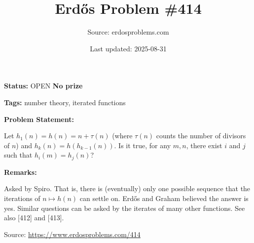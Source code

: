 \documentclass{article}
\title{Erd\H{o}s Problem \#414}
\date{Last updated: 2025-08-31}
\author{Source: erdosproblems.com}
\begin{document}
\maketitle

\noindent\textbf{Status:} OPEN \quad \textbf{No prize}

\noindent\textbf{Tags:} number theory, iterated functions

\medskip
\noindent\textbf{Problem Statement:}

Let $h_1(n)=h(n)=n+\tau(n)$ (where $\tau(n)$ counts the number of divisors of $n$) and $h_k(n)=h(h_{k-1}(n))$. Is it true, for any $m,n$, there exist $i$ and $j$ such that $h_i(m)=h_j(n)$?

\bigskip
\noindent\textbf{Remarks:}

Asked by Spiro. That is, there is (eventually) only one possible sequence that the iterations of $n\mapsto h(n)$ can settle on. Erd\H{o}s and Graham believed the answer is yes. Similar questions can be asked by the iterates of many other functions. See also [412] and [413].

\bigskip
\noindent\small{Source: \url{https://www.erdosproblems.com/414}}
\end{document}
